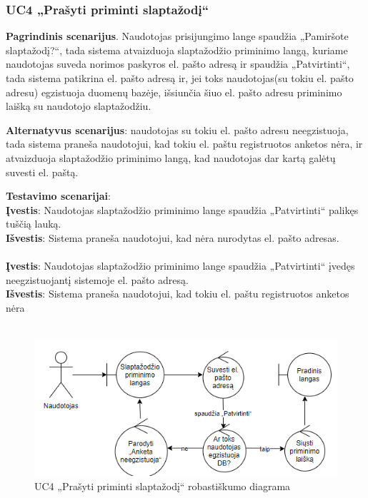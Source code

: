 \documentclass{VUMIFPSbakalaurinis}
\begin{document}
\subsubsection{UC4 „Prašyti priminti slaptažodį“}
\textbf{Pagrindinis scenarijus}. Naudotojas prisijungimo lange spaudžia „Pamiršote slaptažodį?“, tada sistema atvaizduoja slaptažodžio priminimo langą, kuriame naudotojas suveda norimos paskyros el. pašto adresą ir spaudžia „Patvirtinti“, tada sistema patikrina el. pašto adresą ir, jei toks naudotojas(su tokiu el. pašto adresu) egzistuoja duomenų bazėje, išsiunčia šiuo el. pašto adresu priminimo laišką su naudotojo slaptažodžiu. 
\par \textbf{Alternatyvus scenarijus}: naudotojas su tokiu el. pašto adresu neegzistuoja, tada sistema praneša naudotojui, kad tokiu el. paštu registruotos anketos nėra, ir atvaizduoja slaptažodžio priminimo langą, kad naudotojas dar kartą galėtų suvesti el. paštą.
\par \textbf{Testavimo scenarijai}:\\
\textbf{Įvestis}: Naudotojas slaptažodžio priminimo lange spaudžia „Patvirtinti“ palikęs tuščią lauką. \\
\textbf{Išvestis}: Sistema praneša naudotojui, kad nėra nurodytas el. pašto adresas. \\ \\
\textbf{Įvestis}: Naudotojas slaptažodžio priminimo lange spaudžia „Patvirtinti“ įvedęs neegzistuojantį sistemoje el. pašto adresą. \\
\textbf{Išvestis}: Sistema praneša naudotojui, kad tokiu el. paštu registruotos anketos nėra\\ \\

\begin{figure}[H]
	\centering
	\includegraphics[scale=0.6]{img/Robustness/UC4}
	\caption{UC4 „Prašyti priminti slaptažodį“ robastiškumo diagrama}
	\label{img:uc4rob}
\end{figure}
\end{document}
